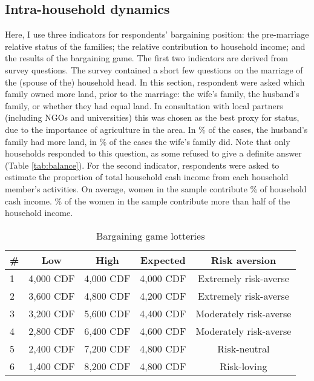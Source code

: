 \documentclass[10pt,a4paper]{scrartcl} %
\begin{document}
\subsection*{Intra-household dynamics}
Here, I use three indicators for respondents' bargaining position: the pre-marriage relative status of the families; the relative contribution to household income; and the results of the bargaining game. The first two indicators are derived from survey questions. The survey contained a short few questions on the marriage of the (spouse of the) household head. In this section, respondent were asked which family owned more land, prior to the marriage: the wife's family, the husband's family, or whether they had equal land. In consultation with local partners (including NGOs and universities) this was chosen as the best proxy for status, due to the importance of agriculture in the area. In \% of the cases, the husband's family had more land, in \% of the cases the wife's family did. Note that only  households responded to this question, as some refused to give a definite answer (Table \ref{tab:balance}). For the second indicator, respondents were asked to estimate the proportion of total household cash income from each household member's activities. On average, women in the sample contribute \% of household cash income. \% of the women in the sample contribute more than half of the household income.

\begin{table}[htb]
	\centering
	\caption{Bargaining game lotteries}
	\label{tab:bargaining}
	\begin{tabular}{l c c c c}
	\toprule
	\# & Low & High & Expected & Risk aversion \\
	\hline
	1 & 4,000 CDF & 4,000 CDF & 4,000 CDF & Extremely risk-averse \\
	2 & 3,600 CDF & 4,800 CDF & 4,200 CDF & Extremely risk-averse \\
	3 & 3,200 CDF & 5,600 CDF & 4,400 CDF & Moderately risk-averse \\
	4 & 2,800 CDF & 6,400 CDF & 4,600 CDF & Moderately risk-averse \\
	5 & 2,400 CDF & 7,200 CDF & 4,800 CDF & Risk-neutral \\
	6 & 1,400 CDF & 8,200 CDF & 4,800 CDF & Risk-loving \\ 
	\bottomrule
	\end{tabular}
\end{table}
\end{document}
